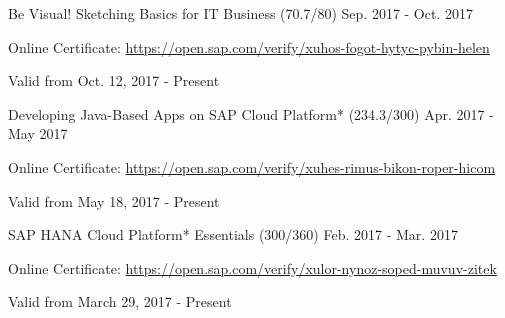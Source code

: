 \begin{cventries}
  \cventry
    {Be Visual! Sketching Basics for IT Business (70.7/80)} %
    {} %
    {} %
    {Sep. 2017 - Oct. 2017} %
    {
	    \begin{cvitems} %
        \item[] {Online Certificate: \url{https://open.sap.com/verify/xuhos-fogot-hytyc-pybin-helen}} %
        \item[] {Valid from Oct. 12, 2017 - Present} %
      \end{cvitems}
    }      
    \vspace{-0.1cm}
  \cventry
    {Developing Java-Based Apps on SAP Cloud Platform* (234.3/300)} %
    {} %
    {} %
    {Apr. 2017 - May 2017} %
    {
	    \begin{cvitems} %
        \item[] {Online Certificate: \url{https://open.sap.com/verify/xuhes-rimus-bikon-roper-hicom}} %
        \item[] {Valid from May 18, 2017 - Present} %
      \end{cvitems}
    }    
    \vspace{-0.1cm}
  \cventry
    {SAP HANA Cloud Platform* Essentials (300/360)} %
    {} %
    {} %
    {Feb. 2017 - Mar. 2017} %
    {
	    \begin{cvitems} %
        \item[] {Online Certificate: \url{https://open.sap.com/verify/xulor-nynoz-soped-muvuv-zitek}} %
        \item[] {Valid from March 29, 2017 - Present} %
      \end{cvitems}
}
\end{cventries}
